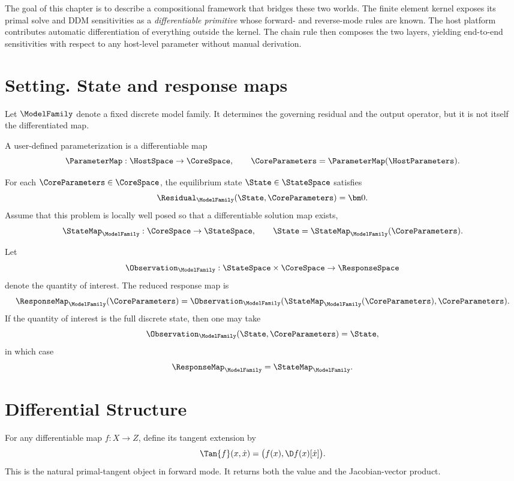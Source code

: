 The goal of this chapter is to describe a compositional framework that
bridges these two worlds.  
The finite element kernel exposes its
primal solve and DDM sensitivities as a \emph{differentiable
primitive} whose forward- and reverse-mode rules are known.  
The host
platform contributes automatic differentiation of everything outside
the kernel.  The chain rule then composes the two layers, yielding
end-to-end sensitivities with respect to any host-level parameter
without manual derivation.


% 

\section{Setting. State and response maps}

Let \(\ModelFamily\) denote a fixed discrete model family. 
It determines the governing residual and the output operator, but it is not itself the differentiated map. 

A user-defined parameterization is a differentiable map
\[
\ParameterMap : \HostSpace \to \CoreSpace,
\qquad
\CoreParameters = \ParameterMap(\HostParameters).
\]

For each \(\CoreParameters \in \CoreSpace\), the equilibrium state \(\State \in \StateSpace\) satisfies
\[
\Residual_{\ModelFamily}(\State,\CoreParameters) = \bm 0.
\]
Assume that this problem is locally well posed so that a differentiable solution map exists,
\[
\StateMap_{\ModelFamily} : \CoreSpace \to \StateSpace,
\qquad
\State = \StateMap_{\ModelFamily}(\CoreParameters).
\]

Let
\[
\Observation_{\ModelFamily} : \StateSpace \times \CoreSpace \to \ResponseSpace
\]
denote the quantity of interest. The reduced response map is
\[
\ResponseMap_{\ModelFamily}(\CoreParameters)
=
\Observation_{\ModelFamily}(\StateMap_{\ModelFamily}(\CoreParameters),\CoreParameters).
\]
If the quantity of interest is the full discrete state, then one may take
\[
\Observation_{\ModelFamily}(\State,\CoreParameters)=\State,
\]
in which case
\[
\ResponseMap_{\ModelFamily}=\StateMap_{\ModelFamily}.
\]

\section{Differential Structure}

For any differentiable map \(f:X\to Z\), define its tangent extension by
\[
\Tan{f}(x,\dot x)
=
\bigl(
f(x),
\D f(x)[\dot x]
\bigr).
\]
This is the natural primal-tangent object in forward mode. 
It returns both the value and the Jacobian-vector product.

